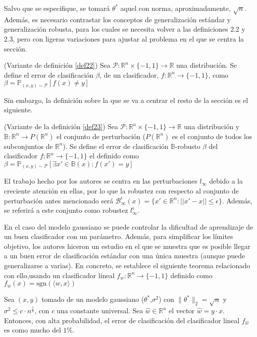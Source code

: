 Salvo que se especifique, se tomará $\theta^*$ aquel con norma, aproximadamente, $\sqrt{n}$. Además, es necesario contrastar los conceptos de generalización estándar y generalización robusta, para los cuales se necesita volver a las definiciones 2.2 y 2.3, pero con ligeras variaciones para ajustar al problema en el que se centra la sección.

\begin{definicion} (Variante de definición \ref{def22})
Sea $\mathcal{P}: \mathbb{R}^n \times \{-1,1\}  \to \mathbb{R}$ una distribución. Se define el error de clasificación $\beta$, de un clasificador, $f: \mathbb{R}^n \to \{-1,1\}$, como $\beta = \mathbb{P}_{(x,y)\sim\mathcal{P}}[f(x) \neq y]$
\end{definicion}

Sin embargo, la definición sobre la que se va a centrar el resto de la sección es el siguiente.

\begin{definicion} (Variante de la definición \ref{def23})
Sea $\mathcal{P}: \mathbb{R}^n \times \{-1,1\}  \to \mathbb{R}$ una distribución y $\mathbb{B}: \mathbb{R}^n \to P(\mathbb{R}^n)$ el conjunto de perturbación ($P(\mathbb{R}^n)$ es el conjunto de todos los subconjuntos de $\mathbb{R}^n$). Se define el error de clasificación $\mathbb{B}$-robusto $\beta$ del clasificador $f: \mathbb{R}^n \to \{-1,1\}$ el definido como $\beta = \mathbb{P}_{(x,y) \sim \mathcal{P}}[\exists x' \in \mathbb{B}(x):f(x')=y]$
\end{definicion}

El trabajo hecho por los autores se centra en las perturbaciones $l_{\infty}$ debido a la creciente atención en ellas, por lo que la robustez con respecto al conjunto de perturbación antes mencionado será $\mathcal{B}_{\infty}^\epsilon (x)=\{x' \in \mathbb{R}^n : ||x'-x||\leq \epsilon \}$. Además, se referirá a este conjunto como robustez $l_{\infty}^\epsilon$.

En el caso del modelo gaussiano se puede controlar la dificultad de aprendizaje de un buen clasificador con un parámetro. Además, para simplificar los límites objetivo, los autores hiceron un estudio en el que se muestra que es posible llegar a un buen error de clasificación estándar con una única muestra (aunque puede generalizarse a varias). En concreto, se establece el siguiente teorema relacionado con ello,usando un clasificador lineal $f_w : \mathbb{R}^n \to \{-1,1\}$ definido como $f_w (x)=\text{sgn} (\langle w,x \rangle)$

\begin{teorema}
Sea $(x,y)$ tomado de un modelo gaussiano ($\theta^* \text{,}\sigma^2$) con $\|\theta^* \|_2 = \sqrt{n}$ y $\sigma^2 \leq c \cdot n^{\frac{1}{4}}$, con $c$ una constante universal. Sea $\hat{w} \in \mathbb{R}^n$ el vector $\hat{w}= y \cdot x$. Entonces, con alta probabilidad, el error de clasificación del clasificador lineal $f_{\hat{w}}$ es como mucho del $1\%$.

\end{teorema}

